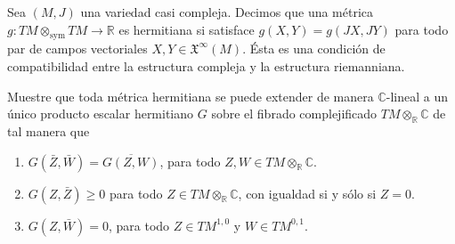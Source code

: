 \begin{problem}
Sea $(M,J)$ una variedad casi compleja. Decimos que una métrica $g : TM \otimes_\mathrm{sym}  TM \to \mathbb R$ es hermitiana si satisface $g(X,Y) = g(JX,JY)$ para todo par de campos vectoriales $X, Y \in \mathfrak X^\infty(M)$. Ésta es una condición de compatibilidad entre la estructura compleja y la estructura riemanniana.

Muestre que toda métrica hermitiana se puede extender de manera $\mathbb C$-lineal a un único producto escalar hermitiano $G$ sobre el fibrado complejificado $TM \otimes_\mathbb R \mathbb C$ de tal manera que
\begin{enumerate}
    \item $G(\bar Z, \bar W) = \overline {G(Z,W)}$, para todo $Z, W \in TM \otimes_\mathbb R \mathbb C$.
    \item $G(Z, \bar Z) \ge 0$ para todo $Z \in TM \otimes_\mathbb R \mathbb C$, con igualdad si y sólo si $Z = 0$.
    \item $G(Z, \bar W) = 0$, para todo $Z \in TM^{1,0}$ y $W \in TM^{0,1}$.
\end{enumerate}
\end{problem}

